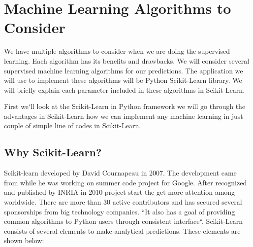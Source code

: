 \documentclass[sigconf]{acmart}
\begin{document}
 


\section{Machine Learning Algorithms to Consider}
We have multiple algorithms to consider when we are doing the supervised learning. Each algorithm has its benefits and drawbacks. We will consider several supervised machine learning algorithms for our predictions. The application we will use to implement these algorithms will be Python Scikit-Learn library. We will briefly explain each parameter included in these algorithms in Scikit-Learn.

\par First we`ll look at the Scikit-Learn in Python framework we will go through the advantages in Scikit-Learn how we can implement any machine learning in just couple of simple line of codes in Scikit-Learn. 

\subsection{Why Scikit-Learn?}
Scikit-learn developed by David Cournapeau in 2007. The development came from while he was working on summer code project for Google. After recognized and published by INRIA in 2010 project start the get more attention among worldwide. There are more than 30 active contributors and has secured several sponsorships from big technology companies\cite{www-machinelearningmystery}. ``It also has a goal of providing common algorithms to Python users through consistent interface\cite{www-oreily}``. Scikit-Learn consists of several elements to make analytical predictions. These elements are shown below\cite{www-analyticvidhya}:
\end{document}
